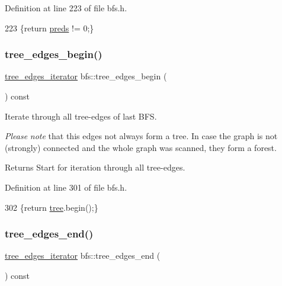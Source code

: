 Definition at line 223 of file bfs.\+h.


\begin{DoxyCode}
223 \{\textcolor{keywordflow}{return} \mbox{\hyperlink{classbfs_a3bac5ed333bb78a30a67099c3b94aa0c}{preds}} != 0;\}
\end{DoxyCode}
\mbox{\label{classbfs_a56959215efdfee1a37826ad315ac13e7}} 
\subsubsection{\texorpdfstring{tree\+\_\+edges\+\_\+begin()}{tree\_edges\_begin()}}
{\footnotesize\ttfamily \mbox{\hyperlink{classbfs_a04e608fe18089e5495cadb995aa75261}{tree\+\_\+edges\+\_\+iterator}} bfs\+::tree\+\_\+edges\+\_\+begin (\begin{DoxyParamCaption}{ }\end{DoxyParamCaption}) const\hspace{0.3cm}{\ttfamily [inline]}}



Iterate through all tree-\/edges of last B\+FS. 

{\itshape Please} {\itshape note} that this edges not always form a tree. In case the graph is not (strongly) connected and the whole graph was scanned, they form a forest.

\begin{DoxyReturn}{Returns}
Start for iteration through all tree-\/edges. 
\end{DoxyReturn}


Definition at line 301 of file bfs.\+h.


\begin{DoxyCode}
302     \{\textcolor{keywordflow}{return} \mbox{\hyperlink{classbfs_a8bc83afea6d1066ea4ceca3007799912}{tree}}.begin();\}
\end{DoxyCode}
\mbox{\label{classbfs_a7db47d5d68e21e95fd548beea1a8db2b}} 
\subsubsection{\texorpdfstring{tree\+\_\+edges\+\_\+end()}{tree\_edges\_end()}}
{\footnotesize\ttfamily \mbox{\hyperlink{classbfs_a04e608fe18089e5495cadb995aa75261}{tree\+\_\+edges\+\_\+iterator}} bfs\+::tree\+\_\+edges\+\_\+end (\begin{DoxyParamCaption}{ }\end{DoxyParamCaption}) const\hspace{0.3cm}{\ttfamily [inline]}}



